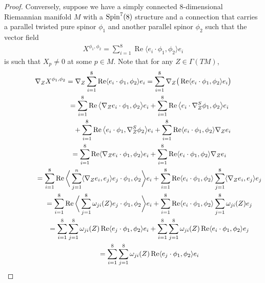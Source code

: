 \documentclass[10pt,a4paper]{amsart}
\numberwithin{equation}{section}
\begin{document}
\begin{proof}
Conversely, suppose we have a simply connected 8-dimensional Riemannian manifold $M$ with a ${\rm Spin}^7(8)$ structure and a connection that carries a parallel twisted pure spinor $\phi_1$ and another parallel spinor $\phi_2$ such that the vector field
\begin{gather*}X^{\phi_1,\phi_2}=\sum_{i=1}^8 \operatorname{Re}\langle e_i\cdot \phi_1,\phi_2\rangle e_i\end{gather*}
is such that $X_p\not=0$ at some $p\in M$. Note that for any $Z\in\Gamma(TM)$,
\begin{gather*}
\nabla_ZX^{\phi_1,\phi_2} = \nabla_Z\sum_{i=1}^8 \operatorname{Re}\langle e_i\cdot \phi_1,\phi_2\rangle e_i = \sum_{i=1}^8 \nabla_Z\big(\operatorname{Re}\langle e_i\cdot \phi_1,\phi_2\rangle e_i\big)\\
\hphantom{\nabla_ZX^{\phi_1,\phi_2}}{}
 = \sum_{i=1}^8 \operatorname{Re}\big\langle \nabla_Ze_i\cdot \phi_1,\phi_2\big\rangle e_i
 + \sum_{i=1}^8 \operatorname{Re}\big\langle e_i\cdot \nabla_Z^S\phi_1,\phi_2\big\rangle e_i\\
\hphantom{\nabla_ZX^{\phi_1,\phi_2}=}{} + \sum_{i=1}^8 \operatorname{Re}\big\langle e_i\cdot \phi_1,\nabla_Z^S\phi_2\big\rangle e_i
 + \sum_{i=1}^8 \operatorname{Re}\langle e_i\cdot \phi_1,\phi_2\rangle \nabla_Ze_i\\
 \hphantom{\nabla_ZX^{\phi_1,\phi_2}}{}
 = \sum_{i=1}^8 \operatorname{Re}\langle \nabla_Ze_i\cdot \phi_1,\phi_2\rangle e_i
 + \sum_{i=1}^8 \operatorname{Re}\langle e_i\cdot \phi_1,\phi_2\rangle \nabla_Ze_i\\
\hphantom{\nabla_ZX^{\phi_1,\phi_2}}{}
 = \sum_{i=1}^8 \operatorname{Re}\bigg\langle \sum_{j=1}^n\langle \nabla_Ze_i,e_j\rangle e_j\cdot \phi_1,\phi_2\bigg\rangle e_i
 + \sum_{i=1}^8 \operatorname{Re}\langle e_i\cdot \phi_1,\phi_2\rangle \sum_{j=1}^8\langle \nabla_Ze_i,e_j\rangle e_j\\
\hphantom{\nabla_ZX^{\phi_1,\phi_2}}{}
 = \sum_{i=1}^8 \operatorname{Re}\bigg\langle \sum_{j=1}^8\omega_{ji}(Z)e_j\cdot \phi_1,\phi_2\bigg\rangle e_i
 + \sum_{i=1}^8 \operatorname{Re}\langle e_i\cdot \phi_1,\phi_2\rangle \sum_{j=1}^8\omega_{ji}(Z)e_j\\
\hphantom{\nabla_ZX^{\phi_1,\phi_2}}{}
 = \sum_{i=1}^8 \sum_{j=1}^8\omega_{ji}(Z)\operatorname{Re}\langle e_j\cdot \phi_1,\phi_2\rangle e_i
 + \sum_{i=1}^8 \sum_{j=1}^8\omega_{ji}(Z)\operatorname{Re}\langle e_i\cdot \phi_1,\phi_2\rangle e_j\\
 \hphantom{\nabla_ZX^{\phi_1,\phi_2}}{}
 = \sum_{i=1}^8 \sum_{j=1}^8\omega_{ji}(Z)\operatorname{Re}\langle e_j\cdot \phi_1,\phi_2\rangle e_i

\end{gather*}
\end{proof}
\end{document}
